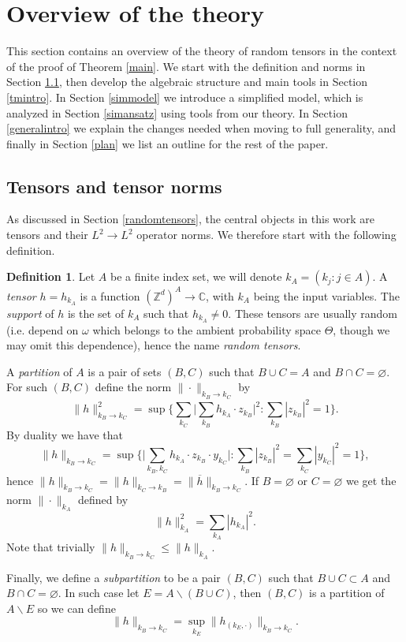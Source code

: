 \documentclass[11 pt,reqno]{amsart}
\theoremstyle{definition}
\newtheorem{df}[thm]{Definition}
\theoremstyle{remark}
\numberwithin{equation}{section}
\newcommand{\Cb}{\mathbb{C}}
\newcommand{\Zb}{\mathbb{Z}}
\begin{document}
 \section{Overview of the theory}\label{intro2} This section contains an overview of the theory of random tensors in the context of the proof of Theorem \ref{main}. We start with the definition and norms in Section \ref{tensorintro}, then develop the algebraic structure and main tools in Section \ref{tmintro}. In Section \ref{simmodel} we introduce a simplified model, which is analyzed in Section \ref{simansatz} using tools from our theory. In Section \ref{generalintro} we explain the changes needed when moving to full generality, and finally in Section \ref{plan} we list an outline for the rest of the paper.
 \subsection{Tensors and tensor norms}\label{tensorintro} As discussed in Section \ref{randomtensors}, the central objects in this work are tensors and their $L^2\to L^2$ operator norms. We therefore start with the following definition.
\begin{df}\label{tensornorms} Let $A$ be a finite index set, we will denote $k_A=(k_j:j\in A)$. A \emph{tensor} $h=h_{k_A}$ is a function $(\Zb^d)^A\to \Cb$, with $k_A$ being the input variables. The \emph{support} of $h$ is the set of $k_A$ such that $h_{k_A}\neq 0$. These tensors are usually random (i.e. depend on $\omega$ which belongs to the ambient probability space $\Theta$, though we may omit this dependence), hence the name \emph{random tensors}.

A \emph{partition} of $A$ is a pair of sets $(B,C)$ such that $B\cup C=A$ and $B\cap C=\varnothing$. For such $(B,C)$ define the norm $\|\cdot\|_{k_B\to k_C}$ by
 \[\|h\|_{k_B\to k_C}^2=\sup\bigg\{\sum_{k_C}\bigg|\sum_{k_B}h_{k_A}\cdot z_{k_B}\bigg|^2:\sum_{k_B}|z_{k_B}|^2=1\bigg\}.\]By duality we have that 
 \begin{equation}\label{duality}\|h\|_{k_B\to k_C}=\sup\bigg\{\bigg|\sum_{k_B,k_C}h_{k_A}\cdot z_{k_B}\cdot y_{k_C}\bigg|:\sum_{k_B}|z_{k_B}|^2=\sum_{k_C}|y_{k_C}|^2=1\bigg\},
 \end{equation} hence $\|h\|_{k_B\to k_C}=\|h\|_{k_C\to k_B}=\|\overline{h}\|_{k_B\to k_C}$. If $B=\varnothing$ or $C=\varnothing$ we get the norm $\|\cdot\|_{k_A}$ defined by
 \[\|h\|_{k_A}^2=\sum_{k_A}|h_{k_A}|^2.\] Note that trivially $\|h\|_{k_B\to k_C}\leq \|h\|_{k_A}$.
 
 Finally, we define a \emph{subpartition} to be a pair $(B,C)$ such that $B\cup C\subset A$ and $B\cap C=\varnothing$. In such case let $E=A\backslash (B\cup C)$, then $(B,C)$ is a partition of $A\backslash E$ so we can define
 \begin{equation}\label{tensornorms:sup}
  \|h\|_{k_B\to k_C}=\sup_{k_E}\|h_{(k_E,\cdot)}\|_{k_B\to k_C}.
   \end{equation}
 \end{df}
\end{document}
